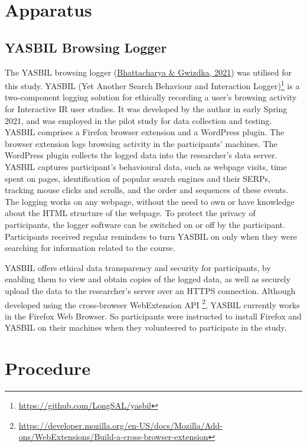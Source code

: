 \documentclass[letterpaper, nobind]{templates/ociamthesis}
\begin{document}
\hypertarget{apparatus}{%
\section{Apparatus}\label{apparatus}}

\hypertarget{yasbil-browsing-logger}{%
\subsection{YASBIL Browsing Logger}\label{yasbil-browsing-logger}}

The YASBIL browsing logger (\protect\hyperlink{ref-bhattacharya2021yasbil}{Bhattacharya \& Gwizdka, 2021}) was utilised
for this study. YASBIL (Yet Another Search Behaviour and Interaction
Logger)\footnote{\url{https://github.com/LongSAL/yasbil}} is a two-component logging solution for ethically recording a
user's browsing activity for Interactive IR user studies. It was
developed by the author in early Spring 2021, and was employed in the
pilot study for data collection and testing. YASBIL comprises a Firefox
browser extension and a WordPress plugin. The browser extension logs
browsing activity in the participants' machines. The WordPress plugin
collects the logged data into the researcher's data server. YASBIL
captures participant's behavioural data, such as webpage visits, time
spent on pages, identification of popular search engines and their
SERPs,
tracking mouse
clicks and scrolls, and the order and sequences of these events. The
logging works on any webpage, without the need to own or have knowledge
about the HTML structure of the webpage. To protect the privacy of
participants, the logger software can be switched on or off by the participant.
Participants received regular reminders to turn YASBIL on only when they were searching for information related to the course.

YASBIL offers ethical data transparency and security
for participants, by enabling them to view and obtain copies of the
logged data, as well as securely upload the data to the researcher's
server over an HTTPS connection. Although developed using the
cross-browser WebExtension API \footnote{\url{https://developer.mozilla.org/en-US/docs/Mozilla/Add-ons/WebExtensions/Build-a-cross-browser-extension}}, YASBIL
currently works in the Firefox Web Browser. So participants were
instructed to install Firefox and YASBIL on their machines when they
volunteered to participate in the study.

\hypertarget{sec-method-procedure}{%
\section{Procedure}\label{sec-method-procedure}}
\end{document}
